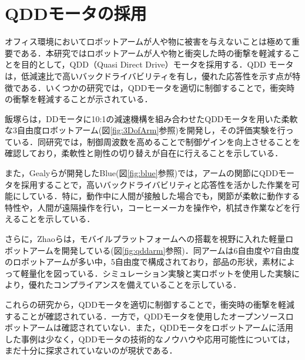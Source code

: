 
\section{QDDモータの採用}
オフィス環境においてロボットアームが人や物に被害を与えないことは極めて重要である．本研究ではロボットアームが人や物と衝突した時の衝撃を軽減することを目的として，QDD（Quasi Direct Drive）モータを採用する．QDD モータは，低減速比で高いバックドライバビリティを有し，優れた応答性を示す点が特徴である．いくつかの研究では，QDDモータを適切に制御することで，衝突時の衝撃を軽減することが示されている．

飯塚ら\cite{飯塚浩太2021}は，DDモータに10:1の減速機構を組み合わせたQDDモータを用いた柔軟な3自由度ロボットアーム(図\ref{fig:3DofArm}参照)を開発し，その評価実験を行っている．同研究では，制御周波数を高めることで制御ゲインを向上させることを確認しており，柔軟性と剛性の切り替えが自在に行えることを示している．

また，Gealyら\cite{gealy2019}が開発したBlue(図\ref{fig:blue}参照)では，アームの関節にQDDモータを採用することで，高いバックドライバビリティと応答性を活かした作業を可能にしている．特に，動作中に人間が接触した場合でも，関節が柔軟に動作する特性や，人間が遠隔操作を行い，コーヒーメーカを操作や，机拭き作業などを行えることを示している\cite{Blue:online}．

さらに，Zhaoら\cite{10106520}は，モバイルプラットフォームへの搭載を視野に入れた軽量ロボットアームを開発している(図\ref{fig:qddarm}参照)．同アームは6自由度や7自由度のロボットアームが多い中，5自由度で構成されており，部品の形状，素材によって軽量化を図っている．シミュレーション実験と実ロボットを使用した実験により，優れたコンプライアンスを備えていることを示している．

これらの研究から，QDDモータを適切に制御することで，衝突時の衝撃を軽減することが確認されている．一方で，QDDモータを使用したオープンソースロボットアームは確認されていない．また，QDDモータをロボットアームに活用した事例は少なく，QDDモータの技術的なノウハウや応用可能性については，まだ十分に探求されていないのが現状である．

